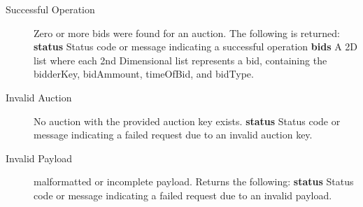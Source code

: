 \documentclass{article}
\begin{document}
\begin{description}
    \item[Successful Operation] Zero or more bids were found for an auction.
        The following is returned:
        \subitem\textbf{status} Status code or message indicating a successful
        operation
        \subitem\textbf{bids} A 2D list where each 2nd Dimensional list
        represents a bid, containing the bidderKey, bidAmmount, timeOfBid, and
        bidType.

    \item[Invalid Auction] No auction with the provided auction key exists.
        \subitem\textbf{status} Status code or message indicating a failed
        request due to an invalid auction key.

    \item[Invalid Payload] malformatted or incomplete payload. Returns the
        following:
        \subitem\textbf{status} Status code or message indicating a failed
        request due to an invalid payload.

\end{description}
\end{document}

